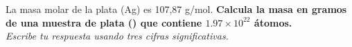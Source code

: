 La masa molar de la plata (Ag) es 107,87 g/mol.
\textbf{Calcula la masa en gramos de una muestra de plata () que contiene $1.97 \times 10^{22}$ átomos.}\\
\emph{Escribe tu respuesta usando tres cifras significativas.}